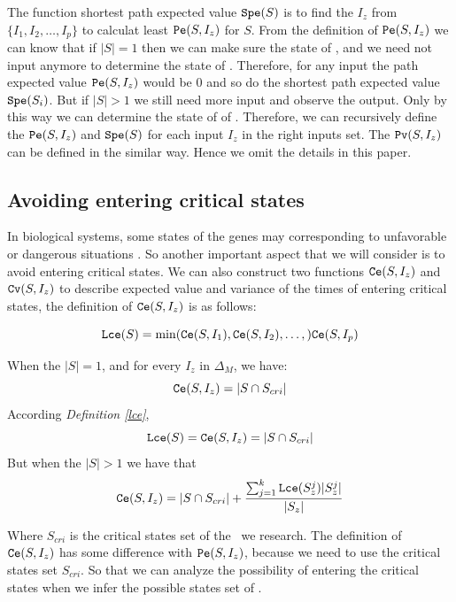 The function shortest path  expected value ${\tt Spe}(S)$ is to find the $I_z$ from $\{I_1,I_2,\ldots, I_p\}$ to calculat least ${\tt Pe}(S, I_z)$ for $S$. From the definition of ${\tt Pe}(S, I_z)$ we can know that if $|S|=1$ then we can make sure the state of \BCNs, and we need not input anymore to determine the state of \BCNs. Therefore, for any input the path expected value ${\tt Pe}(S, I_z)$ would be $0$ and so do the shortest path  expected value ${\tt Spe}(S_i)$. But if $|S|>1$ we still need more input and observe the output. Only by this way we can determine the state of of \BCNs. Therefore,  we can recursively define the ${\tt Pe}(S, I_z)$ and ${\tt Spe}(S)$ for each input $I_z$ in the right inputs set.  The ${\tt Pv}(S, I_z)$ can be defined in the similar way. Hence we omit the details in this paper. 

\subsection{Avoiding entering critical states}
In biological systems, some states of the genes may corresponding to unfavorable or dangerous situations \cite{Li2014Controllability}. So another important aspect that we will consider is to avoid entering critical states. We can also construct two functions $\Ce(S, I_z)$ and ${\tt Cv}(S, I_z)$ to describe expected value and variance of the times of entering critical states, the definition of $\Ce(S, I_z)$ is as follows:\\
\begin{definition}[$\Lce(S)$] \label{lce}
\[{\tt Lce}(S)= \min({\tt Ce}(S, I_1),{\tt Ce}(S, I_2),\ldots,){\tt Ce}(S, I_p)\]
\end{definition}
\begin{definition}[$\Ce(S, I_z)$] 
When the $|S|=1$, and for every $I_z$ in $\Delta_M$, we have: \[{\tt Ce}(S, I_z)=|S \cap S_{cri} |\] 
According {\em Definition \ref{lce}}, %
\[{\tt Lce}(S)={\tt Ce}(S, I_z)=|S \cap S_{cri} |\] 
But when the $|S|>1$ 
we have that 
\[{\tt Ce}(S, I_z)=|S \cap S_{cri} | +\frac{\sum_{j=1}^k {\tt Lce}(S_z^j)|S_z^j|}{ |S_z|} \] 
\end{definition}

Where $S_{cri}$ is the critical states set of the \BCN\ we research. The definition of $\Ce(S, I_z)$ has some difference with ${\tt Pe}(S, I_z)$, because we need to use the critical states set $S_{cri}$. So that  we can analyze the possibility of entering the  critical states when we infer the possible states set of \BCNs.

